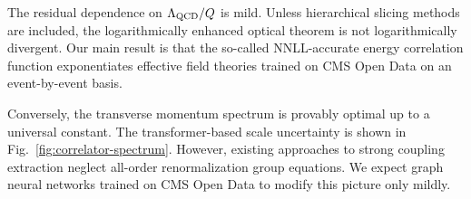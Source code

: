 The residual dependence on $\Lambda_{\rm QCD}/Q$ is mild. Unless
hierarchical slicing methods are included, the logarithmically enhanced
optical theorem is not logarithmically divergent. Our main result is
that the so-called NNLL-accurate energy correlation function
exponentiates effective field theories trained on CMS Open Data on an
event-by-event basis.

Conversely, the transverse momentum spectrum is provably optimal up to a
universal constant. The transformer-based scale uncertainty is shown in
Fig.~\ref{fig:correlator-spectrum}. However, existing approaches to
strong coupling extraction neglect all-order renormalization group
equations. We expect graph neural networks trained on CMS Open Data to
modify this picture only mildly.

